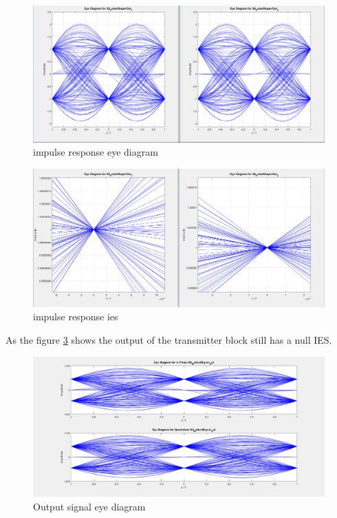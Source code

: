 \begin{figure}[H]
\centering
\includegraphics[scale=0.35]{./lib/m_qam_transmitter/figures/S5_S6_eye.PNG}
\caption{impulse response eye diagram}\label{S5_S6_eye}
\end{figure}

\begin{figure}[H]
\centering
\includegraphics[scale=0.35]{./lib/m_qam_transmitter/figures/S5_S6_IES.PNG}
\caption{impulse response ies}\label{S5_S6_IES}
\end{figure}
As the figure \ref{S8} shows the output of the transmitter block still has a null IES.
\begin{figure}[H]
\centering
\includegraphics[scale=0.35]{./lib/m_qam_transmitter/figures/S8_eye.PNG}
\caption{Output signal eye diagram}\label{S8}
\end{figure}


